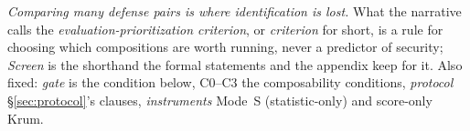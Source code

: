 \documentclass{article}
\begin{document}
%
\emph{Comparing many defense pairs is where identification is lost.} What the narrative calls the \emph{evaluation-prioritization criterion}, or \emph{criterion} for short, is a rule for choosing which compositions are worth running, never a predictor of security; \emph{Screen} is the shorthand the formal statements and the appendix keep for it. Also fixed: \emph{gate} is the condition below, C0--C3 the composability conditions, \emph{protocol} §\ref{sec:protocol}'s clauses, \emph{instruments} Mode~S (statistic-only) and score-only Krum.
\end{document}
